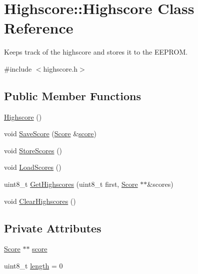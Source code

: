 \hypertarget{class_highscore_1_1_highscore}{}\section{Highscore\+:\+:Highscore Class Reference}
\label{class_highscore_1_1_highscore}


Keeps track of the highscore and stores it to the E\+E\+P\+R\+OM.  




{\ttfamily \#include $<$highscore.\+h$>$}

\subsection*{Public Member Functions}
\begin{DoxyCompactItemize}
\item 
\hyperlink{class_highscore_1_1_highscore_a64076b0cd51d8045a6cac3e53e2ada79}{Highscore} ()
\item 
void \hyperlink{class_highscore_1_1_highscore_ae19e8a6c55b49d6dd874b61ef496dcea}{Save\+Score} (\hyperlink{struct_highscore_1_1_score}{Score} \&\hyperlink{class_highscore_1_1_highscore_a569a403dc24a8fa67efd7065148f4c9d}{score})
\item 
void \hyperlink{class_highscore_1_1_highscore_ad0e1b3277228a38513b5c86059ebcd6d}{Store\+Scores} ()
\item 
void \hyperlink{class_highscore_1_1_highscore_acaba923c4f4acb3c174fb5e325f1bc5e}{Load\+Scores} ()
\item 
uint8\+\_\+t \hyperlink{class_highscore_1_1_highscore_af863b0108cf33796e96efa6d0ba613a1}{Get\+Highscores} (uint8\+\_\+t first, \hyperlink{struct_highscore_1_1_score}{Score} $\ast$$\ast$\&scores)
\item 
void \hyperlink{class_highscore_1_1_highscore_ad2d0f11408e3d47c7b8434a71212f6c2}{Clear\+Highscores} ()
\end{DoxyCompactItemize}
\subsection*{Private Attributes}
\begin{DoxyCompactItemize}
\item 
\hyperlink{struct_highscore_1_1_score}{Score} $\ast$$\ast$ \hyperlink{class_highscore_1_1_highscore_a569a403dc24a8fa67efd7065148f4c9d}{score}
\item 
uint8\+\_\+t \hyperlink{class_highscore_1_1_highscore_a18a119eae9c24ab69477411b9bf45867}{length} = 0
\end{DoxyCompactItemize}


